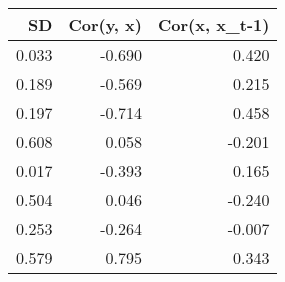 \begin{tabular}{rrr}
\toprule
SD & Cor(y, x) & Cor(x, x_t-1) \\
\midrule
0.033 & -0.690 & 0.420 \\
0.189 & -0.569 & 0.215 \\
0.197 & -0.714 & 0.458 \\
0.608 & 0.058 & -0.201 \\
0.017 & -0.393 & 0.165 \\
0.504 & 0.046 & -0.240 \\
0.253 & -0.264 & -0.007 \\
0.579 & 0.795 & 0.343 \\
\bottomrule
\end{tabular}
